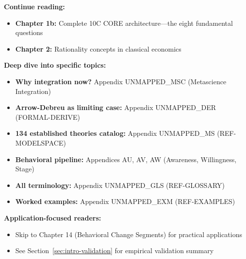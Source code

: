 \vspace{1em}

\begin{tcolorbox}[colback=green!5!white, colframe=green!75!black,
    title=\textbf{Reading Paths from Chapter 1}]
\small

\textbf{Continue reading:}
\begin{itemize}[nosep]
    \item \textbf{Chapter 1b:} Complete 10C CORE architecture---the eight fundamental questions
    \item \textbf{Chapter 2:} Rationality concepts in classical economics
\end{itemize}

\medskip
\textbf{Deep dive into specific topics:}
\begin{itemize}[nosep]
    \item \textbf{Why integration now?} Appendix UNMAPPED_MSC (Metascience Integration)
    \item \textbf{Arrow-Debreu as limiting case:} Appendix UNMAPPED_DER (FORMAL-DERIVE)
    \item \textbf{134 established theories catalog:} Appendix UNMAPPED_MS (REF-MODELSPACE)
    \item \textbf{Behavioral pipeline:} Appendices AU, AV, AW (Awareness, Willingness, Stage)
    \item \textbf{All terminology:} Appendix UNMAPPED_GLS (REF-GLOSSARY)
    \item \textbf{Worked examples:} Appendix UNMAPPED_EXM (REF-EXAMPLES)
\end{itemize}

\medskip
\textbf{Application-focused readers:}
\begin{itemize}[nosep]
    \item Skip to Chapter 14 (Behavioral Change Segments) for practical applications
    \item See Section~\ref{sec:intro-validation} for empirical validation summary
\end{itemize}
\end{tcolorbox}


